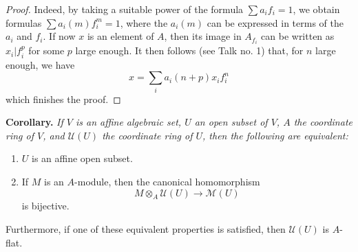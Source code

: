 \documentclass[british]{article}
\providecommand{\tightlist}{%
\setlength{\itemsep}{0pt}\setlength{\parskip}{0pt}}
\newenvironment{itenv}[1]
  {\phantomsection\par\smallskip\noindent\textbf{#1.}\itshape}
  {\par\smallskip}
\newcommand{\oldpage}[1]{\marginpar{\footnotesize$\Big\vert$ \textit{p.~#1}}}
\begin{document}
\begin{proof}
Indeed, by taking a suitable power of the formula \(\sum a_i f_i=1\), we
obtain formulas \(\sum a_i(m)f_i^m=1\), where the \(a_i(m)\) can be
expressed in terms of the \(a_i\) and \(f_i\). If now \(x\) is an
element of \(A\), then its image in \(A_{f_i}\) can be written as
\(x_i|f_i^p\) for some \(p\) large enough. It then follows (see Talk no.
1) that, for \(n\) large enough, we have \[
  x = \sum_i a_i(n+p) x_i f_i^n
\] which finishes the proof.
\end{proof}

\protect{}\label{corollary}
\begin{itenv}{Corollary}
If \(V\) is an affine algebraic set, \(U\) an open subset of \(V\),
\(A\) the coordinate ring of \(V\), and \({\mathscr{U}}(U)\) the
coordinate ring of \(U\), then the following are equivalent:

\begin{enumerate}
\def\labelenumi{\alph{enumi}.}
\tightlist
\item
  \(U\) is an affine open subset.
\item
  If \(M\) is an \(A\)-module, then the canonical homomorphism \[
     M\otimes_A{\mathscr{U}}(U) \to {\mathscr{M}}(U)
   \] is bijective.
\end{enumerate}

\oldpage{2-08}

Furthermore, if one of these equivalent properties is satisfied, then
\({\mathscr{U}}(U)\) is \(A\)-flat.

\end{itenv}
\end{document}
